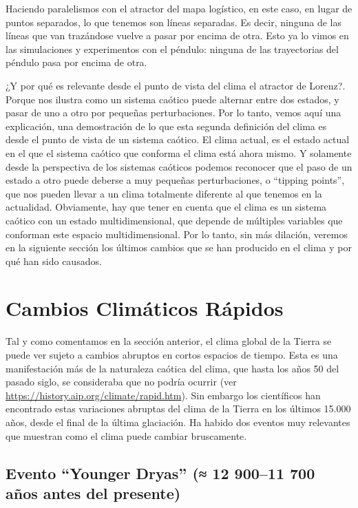 \documentclass[
  10pt,
  a4paper,
  DIV=11,
  numbers=noendperiod,
  open=any]{scrreprt}
\numberwithin{equation}{chapter}
\numberwithin{equation}{section}
\renewcommand{\[}{\begin{equation}}
\renewcommand{\]}{\end{equation}}
\begin{document}
Haciendo paralelismos con el atractor del mapa logístico, en este caso,
en lugar de puntos separados, lo que tenemos son líneas separadas. Es
decir, ninguna de las líneas que van trazándose vuelve a pasar por
encima de otra. Esto ya lo vimos en las simulaciones y experimentos con
el péndulo: ninguna de las trayectorias del péndulo pasa por encima de
otra.

¿Y por qué es relevante desde el punto de vista del clima el atractor de
Lorenz?. Porque nos ilustra como un sistema caótico puede alternar entre
dos estados, y pasar de uno a otro por pequeñas perturbaciones. Por lo
tanto, vemos aquí una explicación, una demostración de lo que esta
segunda definición del clima es desde el punto de vista de un sistema
caótico. El clima actual, es el estado actual en el que el sistema
caótico que conforma el clima está ahora mismo. Y solamente desde la
perspectiva de los sistemas caóticos podemos reconocer que el paso de un
estado a otro puede deberse a muy pequeñas perturbaciones, o ``tipping
points'', que nos pueden llevar a un clima totalmente diferente al que
tenemos en la actualidad. Obviamente, hay que tener en cuenta que el
clima es un sistema caótico con un estado multidimensional, que depende
de múltiples variables que conforman este espacio multidimensional. Por
lo tanto, sin más dilación, veremos en la siguiente sección los últimos
cambios que se han producido en el clima y por qué han sido causados.

\chapter{Cambios Climáticos
Rápidos}\label{cambios-climuxe1ticos-ruxe1pidos}

Tal y como comentamos en la sección anterior, el clima global de la
Tierra se puede ver sujeto a cambios abruptos en cortos espacios de
tiempo. Esta es una manifestación más de la naturaleza caótica del
clima, que hasta los años 50 del pasado siglo, se consideraba que no
podría ocurrir (ver \url{https://history.aip.org/climate/rapid.htm}). Sin embargo los científicos han encontrado estas
variaciones abruptas del clima de la Tierra en los últimos 15.000 años,
desde el final de la última glaciación. Ha habido dos eventos muy
relevantes que muestran como el clima puede cambiar bruscamente.

\section{Evento ``Younger Dryas'' (≈ 12 900--11 700 años antes del
presente)}\label{evento-younger-dryas-12-90011-700-auxf1os-antes-del-presente}
\end{document}
